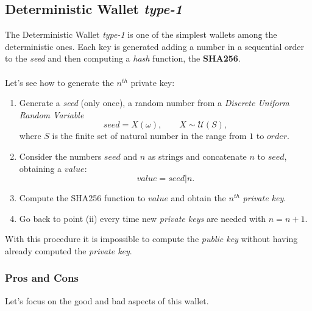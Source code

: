 \subsection{Deterministic Wallet \textit{type-1}}
The Deterministic Wallet \textit{type-1} is one of the simplest wallets among the deterministic ones. Each key is generated adding a number in a sequential order to the \textit{seed} and then computing a \textit{hash} function, the \textbf{SHA256}.
\\ \\
Let's see how to generate the $n^{th}$ private key:

\begin{enumerate}[label=(\roman*)]
	\item Generate a \textit{seed} (only once), a random number from a \textit{Discrete Uniform Random Variable}
	\begin{equation*}
	seed=X(\omega), \qquad X\sim \mathcal{U}(S),
	\end{equation*}
	where $S$ is the finite set of natural number in the range from $1$ to $order$.
	\item Consider the numbers $seed$ and $n$ as strings and concatenate $n$ to $seed$, obtaining a $value$:
	\begin{equation*}
	value=seed|n.
	\end{equation*}
	\item Compute the SHA256 function to $value$ and obtain the $n^{th}$ \textit{private key}.
	\item Go back to point (ii) every time new \textit{private keys} are needed with $n=n+1$. 
\end{enumerate}
With this procedure it is impossible to compute the \textit{public key} without having already computed the \textit{private key}.

\subsubsection{Pros and Cons}
Let's focus on the good and bad aspects of this wallet.

